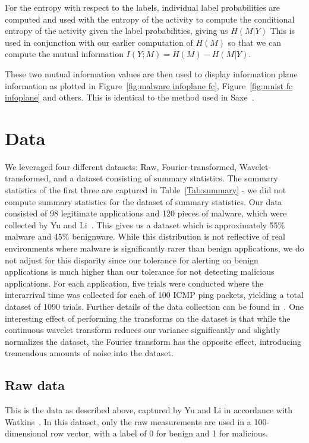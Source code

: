 For the entropy with respect to the labels, individual label probabilities are computed and used with the entropy of the activity to compute the conditional entropy of the activity given the label probabilities, giving us $H(M|Y)$
This is used in conjunction with our earlier computation of $H(M)$ so that we can compute the mutual information $I(Y; M) = H(M) - H(M|Y)$.
 
These two mutual information values are then used to display information plane information as plotted in Figure~\ref{fig:malware infoplane fc}, Figure~\ref{fig:mnist fc infoplane} and others.
This is identical to the method used in Saxe~\cite{saxe2019information}.

\section{Data}\label{data}
We leveraged four different datasets: Raw, Fourier-transformed, Wavelet-transformed, and a dataset consisting of summary statistics.
The summary statistics of the first three are captured in Table~\ref{Tab:summary} - we did not compute summary statistics for the dataset of summary statistics.  
Our data consisted of 98 legitimate applications and 120 pieces of malware, which were collected by Yu and Li~\cite{yu2018network}.
This gives us a dataset which is approximately 55\% malware and 45\% benignware.
While this distribution is not reflective of real environments where malware is significantly rarer than benign applications, we do not adjust for this disparity since our tolerance for alerting on benign applications is much higher than our tolerance for not detecting malicious applications. 
For each application, five trials were conducted where the interarrival time was collected for each of 100 ICMP ping packets, yielding a total dataset of 1090 trials.
Further details of the data collection can be found in~\cite{yu2018network, watkins2013using}.
One interesting effect of performing the transforms on the dataset is that while the continuous wavelet transform reduces our variance significantly and slightly normalizes the dataset, the Fourier transform has the opposite effect, introducing tremendous amounts of noise into the dataset.

\subsection{Raw data}
This is the data as described above, captured by Yu and Li in accordance with Watkins~\cite{watkins2013using}.
In this dataset, only the raw measurements are used in a 100-dimensional row vector, with a label of 0 for benign and 1 for malicious.

